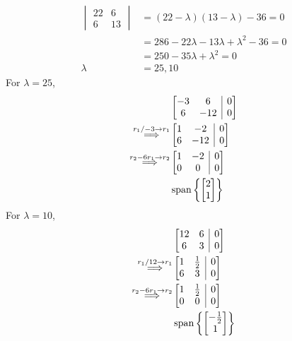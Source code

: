 \documentclass[]{article}
\numberwithin{equation}{section}
\newcommand{\Span}[1]{\operatorname{span}\left\lbrace{#1}\right\rbrace}
\begin{document}
\begin{align}
	\begin{vmatrix}
	22 & 6 \\
	6 & 13
	\end{vmatrix}
	&= (22 - \lambda)(13 - \lambda) - 36 = 0 \\
	&= 286 - 22 \lambda - 13 \lambda + \lambda^2 - 36 = 0 \\
	&= 250 - 35 \lambda + \lambda^2 = 0 \\
	\lambda &= 25,10
\end{align}
For \(\lambda = 25\), 
\begin{align}
	&\left[\begin{array}{@{}cc|c@{}}
	-3 & 6 & 0 \\
	6 & -12 & 0
	\end{array}\right] \\
	\overset{r_1 / -3 \to r_1}{\Longrightarrow} &\left[\begin{array}{@{}cc|c@{}}
	1 & -2 & 0 \\
	6 & -12 & 0
	\end{array}\right] \\
	\overset{r_2 - 6r_1 \to r_2}{\Longrightarrow} &\left[\begin{array}{@{}cc|c@{}}
	1 & -2 & 0 \\
	0 & 0 & 0
	\end{array}\right] \\
	&\Span{\begin{bmatrix}
	2 \\
	1
	\end{bmatrix}}
\end{align}
For \(\lambda = 10\), 
\begin{align}
	&\left[\begin{array}{@{}cc|c@{}}
	12 & 6 & 0 \\
	6 & 3 & 0
	\end{array}\right] \\
	\overset{r_1 / 12 \to r_1}{\Longrightarrow} &\left[\begin{array}{@{}cc|c@{}}
	1 & \frac{1}{2} & 0 \\
	6 & 3 & 0
	\end{array}\right] \\
	\overset{r_2 - 6r_1 \to r_2}{\Longrightarrow} &\left[\begin{array}{@{}cc|c@{}}
	1 & \frac{1}{2} & 0 \\
	0 & 0 & 0
	\end{array}\right] \\
	&\Span{\begin{bmatrix}
		-\frac{1}{2} \\
		1
		\end{bmatrix}}
\end{align}
\end{document}
